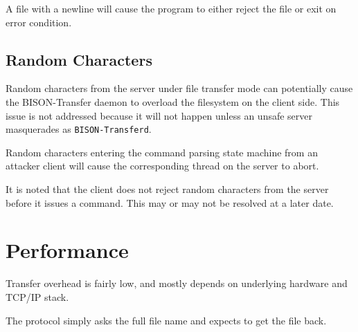\documentclass[12pt]{article}
\begin{document}
A file with a newline will cause the program to either reject the file or
exit on error condition.

\subsection{Random Characters}
\label{sec:random_characters}
Random characters from the server under file transfer mode can potentially
cause the BISON-Transfer daemon to overload the filesystem on the client side.
This issue is not addressed because it will not happen unless an unsafe server
masquerades as \verb+BISON-Transferd+.

Random characters entering the command parsing state machine from an attacker
client will cause the corresponding thread on the server to abort.

It is noted that the client does not reject random characters from the server
before it issues a command.  This may or may not be resolved at a later date.

\section{Performance}
\label{sec:performance}
Transfer overhead is fairly low, and mostly depends on underlying hardware and
TCP/IP stack.

The protocol simply asks the full file name and expects to get the file back.
\end{document}
